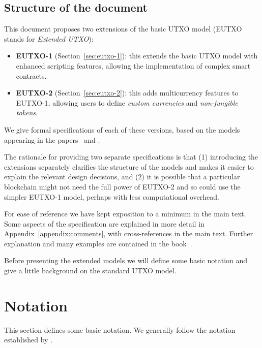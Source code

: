 \documentclass[a4paper]{article}
\theoremstyle{definition}  %
\begin{document}
\subsection{Structure of the document}
\label{sec:doc-structure}
This document proposes two extensions of the basic UTXO model (EUTXO
stands for \textit{Extended UTXO}):

\begin{itemize}
  \item \textbf{EUTXO-1} (Section~\ref{sec:eutxo-1}): this extends the
    basic UTXO model with enhanced scripting features, allowing the
    implementation of complex smart contracts.
  \item \textbf{EUTXO-2} (Section~\ref{sec:eutxo-2}): this adds
    multicurrency features to EUTXO-1, allowing users to define
    \textit{custom currencies} and \textit{non-fungible tokens}.
\end{itemize}

\noindent We give formal specifications of each of these versions,
based on the models appearing in the
papers~\citep{Zahnentferner18-Chimeric} and
\citep{Zahnentferner18-UTxO}.

\medskip

The rationale for providing two separate specifications is that (1)
introducing the extensions separately clarifies the structure of the
models and makes it easier to explain the relevant design decisions,
and (2) it is possible that a particular blockchain might not need the
full power of EUTXO-2 and so could use the simpler EUTXO-1 model,
perhaps with less computational overhead.

\medskip

For ease of reference we have kept exposition to a minimum in the main
text.  Some aspects of the specification are explained in more detail
in Appendix~\ref{appendix:comments}, with cross-references in the main
text.  Further explanation and many examples are contained in the
book~\citep{Plutus-book}.


\bigskip

\noindent Before presenting the extended models we will define some
basic notation and give a little background on the standard UTXO
model.


\section{Notation}
This section defines some basic notation.  We generally follow the
notation established by \citep{Zahnentferner18-UTxO}.
\end{document}
